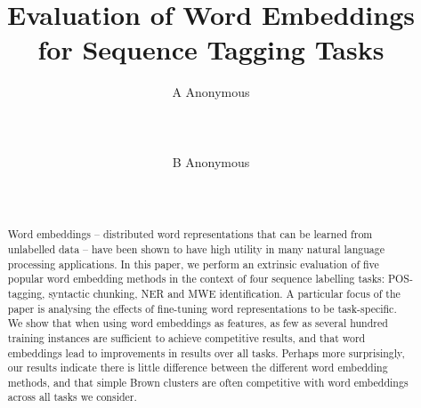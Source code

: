 \documentclass[11pt]{article}
\title{Evaluation of Word Embeddings for Sequence Tagging Tasks}
\author{A Anonymous 
   \\%
   \\ %
   \\ %
  \\ %
\And
  B Anonymous
   \\%
   \\%
   \\ %
}
\date{}
\begin{document}
\maketitle


\begin{abstract} 
  Word embeddings -- distributed word representations that can be
  learned from unlabelled data -- have been shown to have high utility
  in many natural language processing applications. 
  In this paper, we perform an extrinsic evaluation of five popular word
  embedding methods in the context of four sequence labelling tasks:
  POS-tagging, syntactic chunking, NER and MWE identification.
  A particular focus of the paper is analysing the effects of fine-tuning word
  representations to be task-specific.
  We show that when using word embeddings as features, as few as
  several hundred training instances are sufficient to achieve competitive
  results, and that word embeddings lead to improvements in results over
  all tasks.
  Perhaps more surprisingly, our results indicate there is little
  difference between the different word embedding methods, and that simple
  Brown clusters are often competitive with word embeddings across all
  tasks we consider. 
\end{abstract}

\newcommand{\gabi}[1]{\textcolor{blue}{#1}}
\newcommand{\tim}[1]{\textcolor{red}{#1}}
\newcommand{\lizhen}[1]{\textcolor{green}{#1}}
\newcommand{\nss}[1]{\textcolor{magenta}{#1}}













\end{document}
